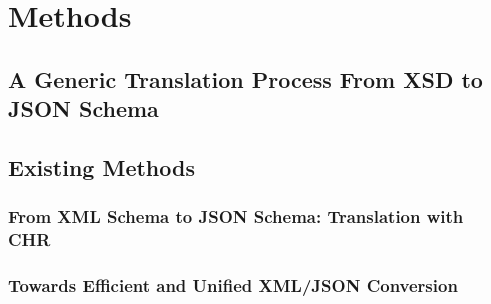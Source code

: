 \section{Methods}
\subsection{A Generic Translation Process From XSD to JSON Schema}
\subsection{Existing Methods}
\subsubsection{From XML Schema to JSON Schema: Translation with CHR}
\subsubsection{Towards Efficient and Unified XML/JSON Conversion}